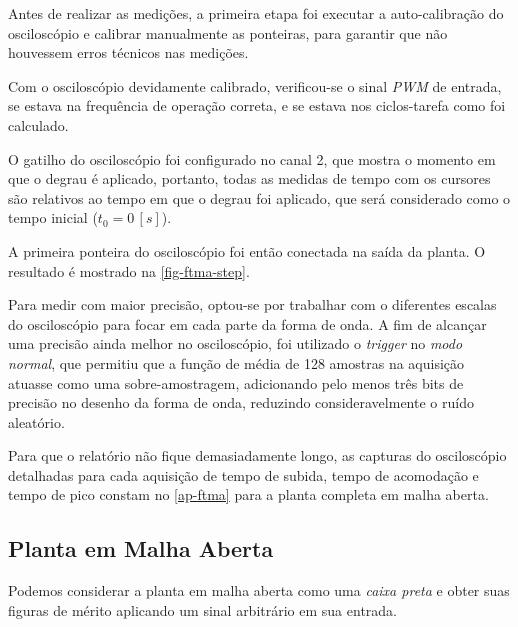 \documentclass[
	12pt,				%
	article,			%
	openright,			%
	oneside,
	a4paper,			%
	chapter=TITLE,		%
	section=TITLE,		%
	english,			%
	french,				%
	spanish,			%
	brazil,				%
]{abntex2}
\begin{document}
        	Antes de realizar as medições, a primeira etapa foi executar a auto-calibração do osciloscópio e calibrar manualmente as ponteiras, para garantir que não houvessem erros técnicos nas medições.
        	
        	Com o osciloscópio devidamente calibrado, verificou-se o sinal \textit{PWM} de entrada, se estava na frequência de operação correta, e se estava nos ciclos-tarefa como foi calculado. 
        	
        	O gatilho do osciloscópio foi configurado no canal 2, que mostra o momento em que o degrau é aplicado, portanto, todas as medidas de tempo com os cursores são relativos ao tempo em que o degrau foi aplicado, que será considerado como o tempo inicial ($t_0=0\,[s]$).
        	
        	A primeira ponteira do osciloscópio foi então conectada na saída da planta. O resultado é mostrado na \autoref{fig-ftma-step}.
        	
        	Para medir com maior precisão, optou-se por trabalhar com o diferentes escalas do osciloscópio para focar em cada parte da forma de onda. A fim de alcançar uma precisão ainda melhor no osciloscópio, foi utilizado o \textit{trigger} no \textit{modo normal}, que permitiu que a função de média de 128 amostras na aquisição atuasse como uma sobre-amostragem, adicionando pelo menos três bits de precisão no desenho da forma de onda, reduzindo consideravelmente o ruído aleatório.
        	
        	Para que o relatório não fique demasiadamente longo, as capturas do osciloscópio detalhadas para cada aquisição de tempo de subida, tempo de acomodação e tempo de pico constam no \autoref{ap-ftma} para a planta completa em malha aberta.
    	
    	\subsection{Planta em Malha Aberta}
        
            Podemos considerar a planta em malha aberta como uma \textit{caixa preta} e obter suas figuras de mérito aplicando um sinal arbitrário em sua entrada.
            
\end{document}
